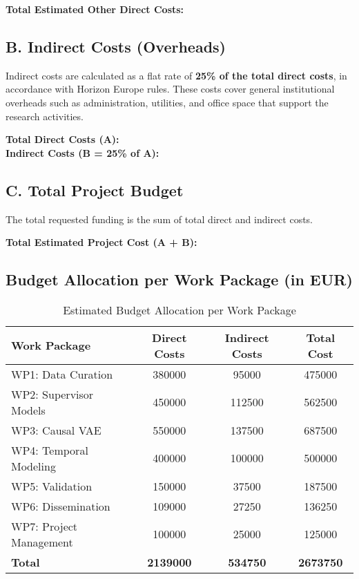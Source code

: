 \textbf{Total Estimated Other Direct Costs: }

\subsection*{B. Indirect Costs (Overheads)}
Indirect costs are calculated as a flat rate of \textbf{25\% of the total direct costs}, in accordance with Horizon Europe rules. These costs cover general institutional overheads such as administration, utilities, and office space that support the research activities.

\textbf{Total Direct Costs (A): } \\
\textbf{Indirect Costs (B = 25\% of A): }

\subsection*{C. Total Project Budget}
The total requested funding is the sum of total direct and indirect costs.

\textbf{Total Estimated Project Cost (A + B): }

\subsection*{Budget Allocation per Work Package (in EUR)}

\begin{table}[H]
\centering
\caption{Estimated Budget Allocation per Work Package}
\label{tab:budget_wp}
\begin{tabular}{lS[table-format=7.0]S[table-format=7.0]S[table-format=7.0]}
\toprule
\textbf{Work Package} & \textbf{Direct Costs} & \textbf{Indirect Costs} & \textbf{Total Cost} \\
\midrule
WP1: Data Curation & 380000 & 95000 & 475000 \\
WP2: Supervisor Models & 450000 & 112500 & 562500 \\
WP3: Causal VAE & 550000 & 137500 & 687500 \\
WP4: Temporal Modeling & 400000 & 100000 & 500000 \\
WP5: Validation & 150000 & 37500 & 187500 \\
WP6: Dissemination & 109000 & 27250 & 136250 \\
WP7: Project Management & 100000 & 25000 & 125000 \\
\midrule
\textbf{Total} & \textbf{2139000} & \textbf{534750} & \textbf{2673750} \\
\bottomrule
\end{tabular}
\end{table}